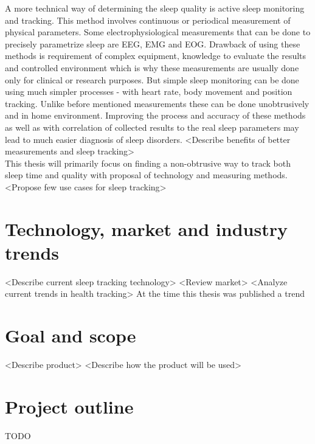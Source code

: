A more technical way of determining the sleep quality is active sleep monitoring and tracking. This method involves continuous or periodical measurement of physical parameters. Some electrophysiological measurements that can be done to precisely parametrize sleep are \ac{EEG}, \ac{EMG} and \ac{EOG}. Drawback of using these methods is requirement of complex equipment, knowledge to evaluate the results and controlled environment which is why these measurements are usually done only for clinical or research purposes. But simple sleep monitoring can be done using much simpler processes - with heart rate, body movement and position tracking. Unlike before mentioned measurements these can be done unobtrusively and in home environment. Improving the process and accuracy of these methods as well as with correlation of collected results to the real sleep parameters may lead to much easier diagnosis of sleep disorders.
<Describe benefits of better measurements and sleep tracking>\\

This thesis will primarily focus on finding a non-obtrusive way to track both sleep time and quality with proposal of technology and measuring methods.\\

<Propose few use cases for sleep tracking>

\section{Technology, market and industry trends}
<Describe current sleep tracking technology>
<Review market>
<Analyze current trends in health tracking>
At the time this thesis was published a trend

\section{Goal and scope}
<Describe product>
<Describe how the product will be used>

\section{Project outline}
TODO